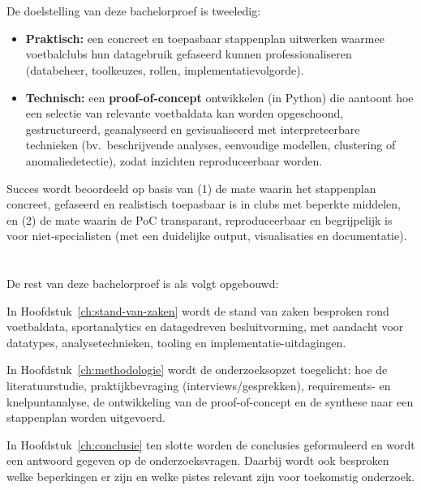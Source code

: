 \section{}%
\label{sec:onderzoeksdoelstelling}

De doelstelling van deze bachelorproef is tweeledig:

\begin{itemize}
  \item \textbf{Praktisch:} een concreet en toepasbaar stappenplan uitwerken waarmee voetbalclubs hun datagebruik gefaseerd kunnen professionaliseren (databeheer, toolkeuzes, rollen, implementatievolgorde).
  \item \textbf{Technisch:} een \textbf{proof-of-concept} ontwikkelen (in Python) die aantoont hoe een selectie van relevante voetbaldata kan worden opgeschoond, gestructureerd, geanalyseerd en gevisualiseerd met interpreteerbare technieken (bv.\ beschrijvende analyses, eenvoudige modellen, clustering of anomaliedetectie), zodat inzichten reproduceerbaar worden.
\end{itemize}

Succes wordt beoordeeld op basis van (1) de mate waarin het stappenplan concreet, gefaseerd en realistisch toepasbaar is in clubs met beperkte middelen, en (2) de mate waarin de PoC transparant, reproduceerbaar en begrijpelijk is voor niet-specialisten (met een duidelijke output, visualisaties en documentatie).

\section{}%
\label{sec:opzet-bachelorproef}


De rest van deze bachelorproef is als volgt opgebouwd:

In Hoofdstuk~\ref{ch:stand-van-zaken} wordt de stand van zaken besproken rond voetbaldata, sportanalytics en datagedreven besluitvorming, met aandacht voor datatypes, analysetechnieken, tooling en implementatie-uitdagingen.

In Hoofdstuk~\ref{ch:methodologie} wordt de onderzoeksopzet toegelicht: hoe de literatuurstudie, praktijkbevraging (interviews/gesprekken), requirements- en knelpuntanalyse, de ontwikkeling van de proof-of-concept en de synthese naar een stappenplan worden uitgevoerd.


In Hoofdstuk~\ref{ch:conclusie} ten slotte worden de conclusies geformuleerd en wordt een antwoord gegeven op de onderzoeksvragen. Daarbij wordt ook besproken welke beperkingen er zijn en welke pistes relevant zijn voor toekomstig onderzoek.